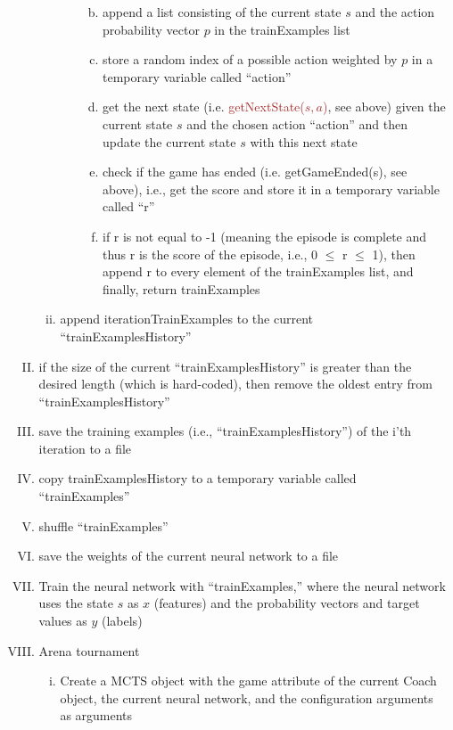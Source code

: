 \documentclass[12pt]{article}
\begin{document}
\begin{redenum}
\begin{enumerate}[A.)]
\begin{enumerate}[I.)]
\begin{enumerate}[i.)]
\begin{enumerate}[a.)]
\begin{goldenum}
\begin{enumerate}[a.)]
\begin{redenumnest}
\begin{enumerate}[a.)]
							\end{enumerate}
							\end{redenumnest}
							\item append a list consisting of the current state $s$ and the action probability vector $p$ in the trainExamples list
							\item store a random index of a possible action weighted by $p$ in a temporary variable called ``action''
							\item get the next state (i.e.  \textcolor{brown}{getNextState($s,a$)}, see above) given the current state $s$ and the chosen action ``action'' and then update the current state $s$ with this next state
							\item check if the game has ended (i.e.  \textcolor{grassgreen}{getGameEnded(s)}, see above), i.e., get the score and store it in a temporary variable called ``r''
							\item if r is not equal to -1 (meaning the episode is complete and thus r is the score of the episode, i.e., 0 $\leq$ r $\leq$ 1), then append r to every element of the trainExamples list, and finally, return trainExamples
						\end{enumerate}
					\end{goldenum}
				\end{enumerate}
				\item append iterationTrainExamples to the current ``trainExamplesHistory''
			\end{enumerate}
			\item if the size of the current ``trainExamplesHistory'' is greater than the desired length (which is hard-coded), then remove the oldest entry from ``trainExamplesHistory''
			\item save the training examples (i.e., ``trainExamplesHistory'') of the i'th iteration to a file
			\item copy trainExamplesHistory to a temporary variable called ``trainExamples''
			\item shuffle ``trainExamples''
			\item save the weights of the current neural network to a file
			\item Train the neural network with ``trainExamples,'' where the neural network uses the state $s$ as $x$ (features) and the probability vectors and target values as $y$ (labels)
			\item Arena tournament
			\begin{enumerate}[i.)]
				\item Create a MCTS object with the game attribute of the current Coach object, the current neural network, and the configuration arguments as arguments

\end{enumerate}
\end{enumerate}
\end{enumerate}
\end{redenum}
\end{document}
